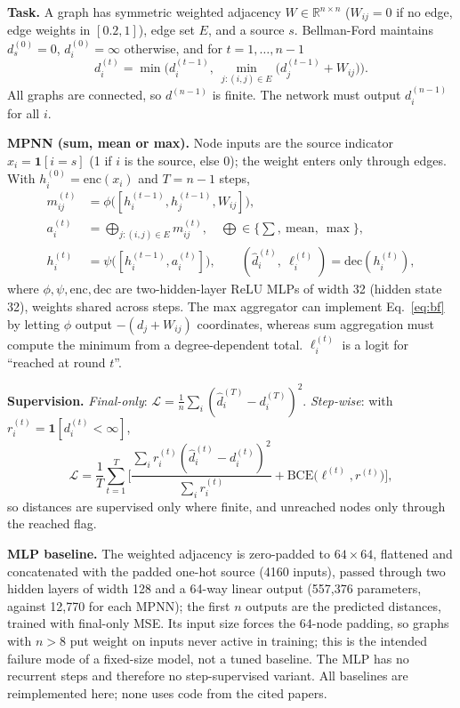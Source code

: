 \textbf{Task.} A graph has symmetric weighted adjacency $W\in\mathbb{R}^{n\times n}$ ($W_{ij}=0$ if no edge, edge weights in $[0.2,1]$), edge set $E$, and a source $s$. Bellman-Ford maintains $d^{(0)}_s=0$, $d^{(0)}_i=\infty$ otherwise, and for $t=1,\dots,n-1$
\begin{equation}
d^{(t)}_i=\min\Big(d^{(t-1)}_i,\ \min_{j:(i,j)\in E}\big(d^{(t-1)}_j+W_{ij}\big)\Big).
\label{eq:bf}
\end{equation}
All graphs are connected, so $d^{(n-1)}$ is finite. The network must output $d^{(n-1)}_i$ for all $i$.

\textbf{MPNN (sum, mean or max).} Node inputs are the source indicator $x_i=\mathbf{1}[i=s]$ (1 if $i$ is the source, else 0); the weight enters only through edges. With $h^{(0)}_i=\mathrm{enc}(x_i)$ and $T=n-1$ steps,
\begin{align}
m^{(t)}_{ij}&=\phi\big([h^{(t-1)}_i,h^{(t-1)}_j,W_{ij}]\big),\\
a^{(t)}_i&=\bigoplus_{j:(i,j)\in E} m^{(t)}_{ij},\quad \bigoplus\in\{\textstyle\sum,\ \mathrm{mean},\ \max\},\\
h^{(t)}_i&=\psi\big([h^{(t-1)}_i,a^{(t)}_i]\big),\qquad (\hat d^{(t)}_i,\ \ell^{(t)}_i)=\mathrm{dec}(h^{(t)}_i),
\end{align}
where $\phi,\psi,\mathrm{enc},\mathrm{dec}$ are two-hidden-layer ReLU MLPs of width 32 (hidden state 32), weights shared across steps. The max aggregator can implement Eq.~\eqref{eq:bf} by letting $\phi$ output $-(d_j+W_{ij})$ coordinates, whereas sum aggregation must compute the minimum from a degree-dependent total. $\ell^{(t)}_i$ is a logit for ``reached at round $t$''.

\textbf{Supervision.} \emph{Final-only}: $\mathcal{L}=\frac1{n}\sum_i(\hat d^{(T)}_i-d^{(T)}_i)^2$. \emph{Step-wise}: with $r^{(t)}_i=\mathbf{1}[d^{(t)}_i<\infty]$,
\begin{equation}
\mathcal{L}=\frac1T\sum_{t=1}^{T}\Big[\frac{\sum_i r^{(t)}_i(\hat d^{(t)}_i-d^{(t)}_i)^2}{\sum_i r^{(t)}_i}+\mathrm{BCE}\big(\ell^{(t)},r^{(t)}\big)\Big],
\end{equation}
so distances are supervised only where finite, and unreached nodes only through the reached flag.

\textbf{MLP baseline.} The weighted adjacency is zero-padded to $64\times64$, flattened and concatenated with the padded one-hot source (4160 inputs), passed through two hidden layers of width 128 and a 64-way linear output (557,376 parameters, against 12,770 for each MPNN); the first $n$ outputs are the predicted distances, trained with final-only MSE. Its input size forces the 64-node padding, so graphs with $n>8$ put weight on inputs never active in training; this is the intended failure mode of a fixed-size model, not a tuned baseline. The MLP has no recurrent steps and therefore no step-supervised variant. All baselines are reimplemented here; none uses code from the cited papers.

